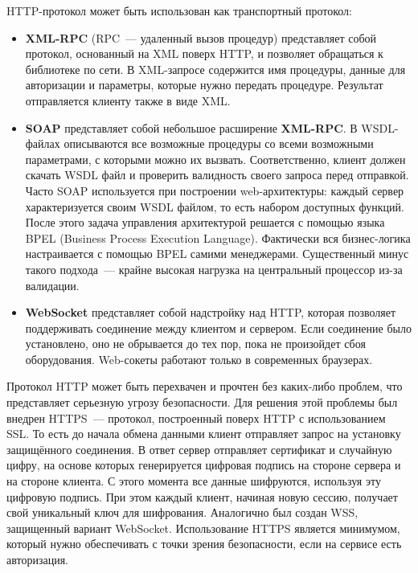 HTTP-протокол может быть использован как транспортный протокол:
\begin{itemize}
  \item \textbf{XML-RPC} (RPC~--- удаленный вызов процедур) представляет собой протокол, основанный на XML поверх HTTP, и позволяет обращаться к библиотеке по сети. В XML-запросе содержится имя процедуры, данные для авторизации и параметры, которые нужно передать процедуре. Результат отправляется клиенту также в виде XML.

  \item \textbf{SOAP} представляет собой небольшое расширение \textbf{XML-RPC}. В WSDL-файлах описываются все возможные процедуры со всеми возможными параметрами, с которыми можно их вызвать. Соответственно, клиент должен скачать WSDL файл и проверить валидность своего запроса перед отправкой. Часто SOAP используется при построении web-архитектуры: каждый сервер характеризуется своим WSDL файлом, то есть набором доступных функций. После этого задача управления архитектурой решается с помощью языка BPEL (Business Process Execution Language).
Фактически вся бизнес-логика настраивается с помощью BPEL самими менеджерами. Существенный минус такого подхода~--- крайне высокая нагрузка на центральный процессор из-за валидации.

  \item \textbf{WebSocket} представляет собой надстройку над HTTP, которая позволяет поддерживать соединение между клиентом и сервером. Если соединение было установлено, оно не обрывается до тех пор, пока не произойдет сбоя оборудования.
Web-сокеты работают только в современных браузерах.
\end{itemize}

Протокол HTTP может быть перехвачен и прочтен без каких-либо проблем, что представляет серьезную угрозу безопасности. Для решения этой проблемы был внедрен HTTPS~--- протокол, построенный поверх HTTP с использованием SSL.
То есть до начала обмена данными клиент отправляет запрос на установку защищённого соединения. В ответ сервер отправляет сертификат и случайную цифру, на основе которых генерируется цифровая подпись на стороне сервера и на стороне клиента. С этого момента все данные шифруются, используя эту цифровую подпись. При этом каждый клиент, начиная новую сессию, получает свой уникальный ключ для шифрования. Аналогично был создан WSS, защищенный вариант WebSocket. Использование HTTPS является минимумом, который нужно обеспечивать с точки зрения безопасности, если на сервисе есть авторизация.

